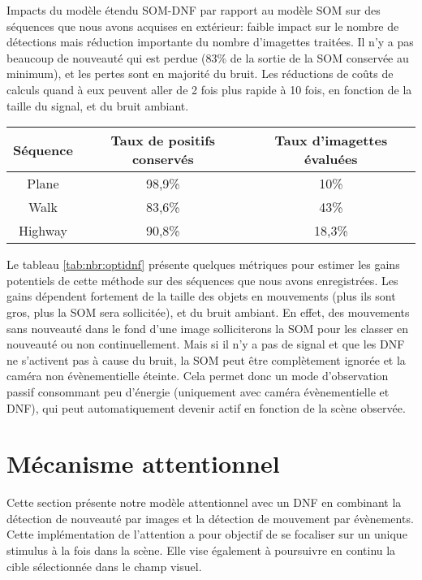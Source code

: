 	\begin{tableth}
	\caption[Impacts du modèle étendu SOM-DNF]{Impacts du modèle étendu SOM-DNF par rapport au modèle SOM sur des séquences que nous avons acquises en extérieur: faible impact sur le nombre de détections mais réduction importante du nombre d'imagettes traitées. Il n'y a pas beaucoup de nouveauté qui est perdue (83\% de la sortie de la SOM conservée au minimum), et les pertes sont en majorité du bruit. Les réductions de coûts de calculs quand à eux peuvent aller de 2 fois plus rapide à 10 fois, en fonction de la taille du signal, et du bruit ambiant.}
	\begin{tabular}{|c|c|c|}
		\hline
		Séquence & Taux de positifs conservés & Taux d'imagettes évaluées\\
		\hline
		Plane & 98,9\% & 10\% \\
		Walk & 83,6\% & 43\% \\
		Highway & 90,8\% & 18,3\% \\
		\hline
	\end{tabular}
	\label{tab:nbr:optidnf}
	\end{tableth}

	Le tableau \ref{tab:nbr:optidnf} présente quelques métriques pour estimer les gains potentiels de cette méthode sur des séquences que nous avons enregistrées. Les gains dépendent fortement de la taille des objets en mouvements (plus ils sont gros, plus la SOM sera sollicitée), et du bruit ambiant. En effet, des mouvements sans nouveauté dans le fond d'une image solliciterons la SOM pour les classer en nouveauté ou non continuellement. Mais si il n'y a pas de signal et que les DNF ne s'activent pas à cause du bruit, la SOM peut être complètement ignorée et la caméra non évènementielle éteinte. Cela permet donc un mode d'observation passif consommant peu d'énergie (uniquement avec caméra évènementielle et DNF), qui peut automatiquement devenir actif en fonction de la scène observée.

	\newpage

	\section{Mécanisme attentionnel}

	Cette section présente notre modèle attentionnel avec un DNF en combinant la détection de nouveauté par images et la détection de mouvement par évènements. Cette implémentation de l'attention a pour objectif de se focaliser sur un unique stimulus à la fois dans la scène. Elle vise également à poursuivre en continu la cible sélectionnée dans le champ visuel.

